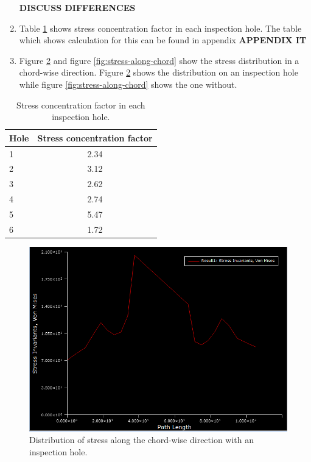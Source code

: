 \documentclass[11pt,a4paper,oneside]{memoir}
\begin{document}
\begin{enumerate}
\begin{figure}[!hbt]
\begin{minipage}{.5\textwidth}
    \label{fig:von-misses-w/o-holes-zoom}
    \end{minipage}
\end{figure}
    \textbf{DISCUSS DIFFERENCES}
    \item Table \ref{tab:stress-conc-factor} shows stress concentration factor in each inspection hole. The table which shows calculation for this can be found in appendix \textbf{APPENDIX IT}
    \item Figure \ref{fig:stress-along-chord-hole} and figure \ref{fig:stress-along-chord} show the stress distribution in a chord-wise direction. Figure \ref{fig:stress-along-chord-hole} shows the distribution on an inspection hole while figure \ref{fig:stress-along-chord} shows the one without.
\end{enumerate}

\begin{table}[h]
    \centering
    \begin{tabular}{l c}
    \toprule
      Hole   &  Stress concentration factor\\
     \midrule
      1   & 2.34\\
      2 &   3.12\\
      3 &   2.62\\
      4 &   2.74\\
      5 &   5.47\\
      6 &   1.72\\
      \bottomrule
    \end{tabular}
    \caption{Stress concentration factor in each inspection hole.}
    \label{tab:stress-conc-factor}
\end{table}

\begin{figure}[h]
    \centering
    \includegraphics[width = .8\textwidth]{figures/Path-length.png}
    \caption{Distribution of stress along the chord-wise direction with an inspection hole.}
    \label{fig:stress-along-chord-hole}
\end{figure}
\end{document}
